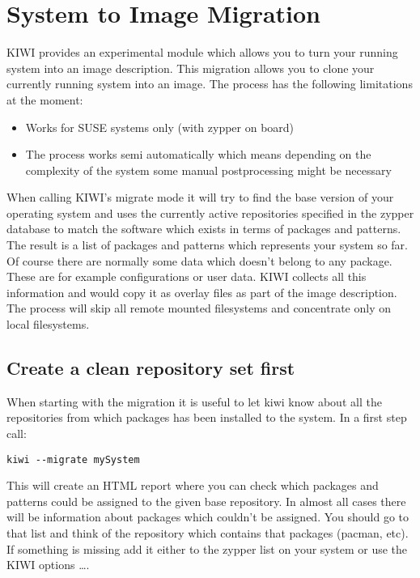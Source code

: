 \chapter{System to Image Migration}
\label{chapter:migration}
\minitoc

KIWI provides an experimental module which allows you to turn your
running system into an image description. This migration allows you
to clone your currently running system into an image. The process
has the following limitations at the moment:

\begin{itemize}
\item Works for SUSE systems only (with zypper on board)
\item The process works semi automatically which means depending
      on the complexity of the system some manual postprocessing might
      be necessary
\end{itemize}

When calling KIWI's migrate mode it will try to find the base version
of your operating system and uses the currently active repositories
specified in the zypper database to match the software which exists
in terms of packages and patterns. The result is a list of packages
and patterns which represents your system so far. Of course there are
normally some data which doesn't belong to any package. These are
for example configurations or user data. KIWI collects all this
information and would copy it as overlay files as part of the image
description. The process will skip all remote mounted filesystems
and concentrate only on local filesystems.

\section{Create a clean repository set first}
When starting with the migration it is useful to let kiwi know about all
the repositories from which packages has been installed to 
the system. In a first step call:

\begin{Command}{12cm}
\begin{verbatim}
kiwi --migrate mySystem
\end{verbatim}
\end{Command}

This will create an HTML report where you can check which packages and
patterns could be assigned to the given base repository. In almost
all cases there will be information about packages which couldn't
be assigned. You should go to that list and think of the repository
which contains that packages (pacman, etc). If something is missing
add it either to the zypper list on your system or use the KIWI
options  \ldots {}.

